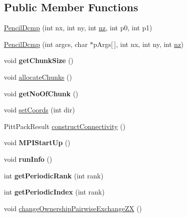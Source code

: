 \subsection*{Public Member Functions}
\begin{DoxyCompactItemize}
\item 
\mbox{\hyperlink{classPencilDcmp_a0252169fc4c2d578ae7b5368e247d557}{Pencil\+Dcmp}} (int nx, int ny, int \mbox{\hyperlink{classPencilDcmp_aedb528abdba6fa4a541af83f851e11c8}{nz}}, int p0, int p1)
\item 
\mbox{\hyperlink{classPencilDcmp_aba2e52de6d05da361e99dfa078ea76ca}{Pencil\+Dcmp}} (int argcs, char $\ast$p\+Args\mbox{[}$\,$\mbox{]}, int nx, int ny, int \mbox{\hyperlink{classPencilDcmp_aedb528abdba6fa4a541af83f851e11c8}{nz}})
\item 
\mbox{\label{classPencilDcmp_a8307c0e36c4489e86638d08f20a3ba50}} 
void {\bfseries get\+Chunk\+Size} ()
\item 
void \mbox{\hyperlink{classPencilDcmp_ade8a6cbeeb92600a30403e74377689c6}{allocate\+Chunks}} ()
\item 
\mbox{\label{classPencilDcmp_ac34b588ab1ea599b003b406e0f7047ac}} 
void {\bfseries get\+No\+Of\+Chunk} ()
\item 
void \mbox{\hyperlink{classPencilDcmp_a885fa996b7c6a9a0b63e046937da5bcb}{set\+Coords}} (int dir)
\item 
Pitt\+Pack\+Result \mbox{\hyperlink{classPencilDcmp_aa0dfe19263f66b6c4c9bf73705d62b15}{construct\+Connectivity}} ()
\item 
\mbox{\label{classPencilDcmp_ad23927d66de2ce94617a0883eaeef222}} 
void {\bfseries M\+P\+I\+Start\+Up} ()
\item 
\mbox{\label{classPencilDcmp_a799167827f38d46f881215fad605ee97}} 
void {\bfseries run\+Info} ()
\item 
\mbox{\label{classPencilDcmp_a326de10cf2e330a4360b9b70f41d1bad}} 
int {\bfseries get\+Periodic\+Rank} (int rank)
\item 
\mbox{\label{classPencilDcmp_abb7f48287933606d2f936768543cc5d3}} 
int {\bfseries get\+Periodic\+Index} (int rank)
\item 
void \mbox{\hyperlink{classPencilDcmp_a2f2e64944e0f8587c7a6f02532b11fc5}{change\+Ownership\+Pairwise\+Exchange\+ZX}} ()

\end{DoxyCompactItemize}
